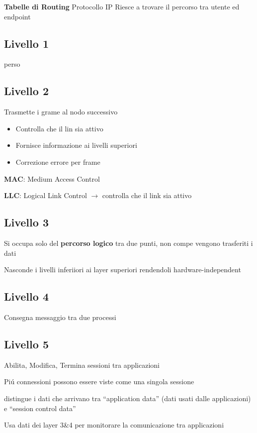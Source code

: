 \documentclass{article}
\begin{document}
\textbf{Tabelle di Routing} Protocollo IP Riesce a trovare il percorso tra utente ed endpoint

\subsection{Livello 1}
perso


\subsection{Livello 2}
Trasmette i grame al nodo successivo
\begin{itemize}
    \item Controlla che il lin sia attivo
    \item Fornisce informazione ai livelli superiori
    \item Correzione errore per frame
\end{itemize}

\textbf{MAC}: Medium Access Control

\textbf{LLC}: Logical Link Control $\rightarrow$ controlla che il link sia attivo


\subsection{Livello 3}
Si occupa solo del \textbf{percorso logico} tra due punti, non compe vengono trasferiti i dati

Nasconde i livelli inferiiori ai layer superiori rendendoli hardware-independent

\subsection{Livello 4}
Consegna messaggio tra due processi

\subsection{Livello 5}
Abilita, Modifica, Termina sessioni tra applicazioni

Pi\'u connessioni possono essere viste come una singola sessione

distingue i dati che arrivano tra ``application data'' (dati usati dalle applicazioni) e ``session control data''

Usa dati dei layer 3\&4 per monitorare la comunicazione tra applicazioni
\end{document}
